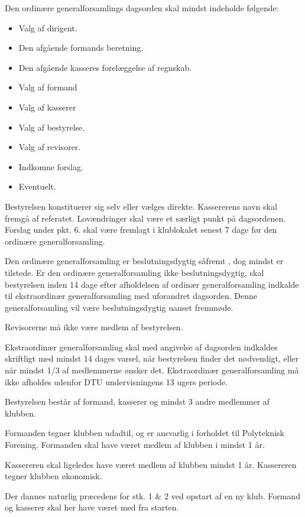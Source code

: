 \begin{list}
 Den ordinære generalforsamlings dagsorden skal mindst indeholde følgende:
\begin{itemize}
\item Valg af dirigent.
\item Den afgående formands beretning.
\item Den afgående kasseres forelæggelse af regnskab.
\item Valg af formand
\item Valg af kasserer
\item Valg af bestyrelse.
\item Valg af revisorer.
\item Indkomne forslag.
\item Eventuelt.
\end{itemize}
Bestyrelsen konstituerer sig selv eller vælges direkte. Kassererens navn skal fremgå af referatet. Lovændringer skal være et særligt punkt på dagsordenen. Forslag under pkt. 6. skal være fremlagt i klublokalet senest 7 dage før den ordinære generalforsamling.

 Den ordinære generalforsamling er beslutningsdygtig såfremt \makebox[0.4in]{\hrulefill}, dog mindst \makebox[0.4in]{\hrulefill} er tilstede. Er den ordinære generalforsamling ikke beslutningsdygtig, skal bestyrelsen inden 14 dage efter afholdelsen af ordinær generalforsamling indkalde til ekstraordinær generalforsamling med uforandret dagsorden. Denne generalforsamling vil være beslutningsdygtig uanset fremmøde.

 Revisorerne må ikke være medlem af bestyrelsen.
\item Ekstraordinær generalforsamling skal med angivelse af dagsorden indkaldes skriftligt med mindst 14 dages varsel, når bestyrelsen finder det nødvendigt, eller når mindst 1/3 af medlemmerne ønsker det. Ekstraordinær generalforsamling må ikke afholdes udenfor DTU undervisningens 13 ugers periode.

\item Bestyrelsen består af formand, kasserer og mindst 3 andre medlemmer af klubben.

\item Formanden tegner klubben udadtil, og er ansvarlig i forholdet til Polyteknisk Forening. Formanden skal have været medlem af klubben i mindst 1 år.

 Kassereren skal ligeledes have været medlem af klubben mindst 1 år. Kassereren tegner klubben økonomisk.

 Der dannes naturlig præcedens for stk. 1 \& 2 ved opstart af en ny klub. Formand og kasserer skal her have været med fra starten.


\end{list}
